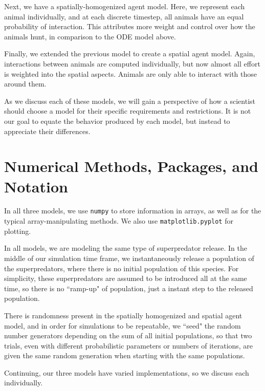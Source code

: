 \documentclass[journal]{IEEEtran}
\begin{document}
Next, we have a spatially-homogenized agent model. Here, we represent each animal individually, and at each discrete timestep, all animals have an equal probability of interaction. This attributes more weight and control over how the animals hunt, in comparison to the ODE model above.\par
Finally, we extended the previous model to create a spatial agent model. Again, interactions between animals are computed individually, but now almost all effort is weighted into the spatial aspects. Animals are only able to interact with those around them.\par
As we discuss each of these models, we will gain a perspective of how a scientist should choose a model for their specific requirements and restrictions. It is not our goal to equate the behavior produced by each model, but instead to appreciate their differences.

\section{Numerical Methods, Packages, and Notation}
In all three models, we use \verb|numpy| to store information in arrays, as well as for the typical array-manipulating methods. We also use \verb|matplotlib.pyplot| for plotting.\par
In all models, we are modeling the same type of superpredator release. In the middle of our simulation time frame, we instantaneously release a population of the superpredators, where there is no initial population of this species. For simplicity, these superpredators are assumed to be introduced all at the same time, so there is no ``ramp-up" of population, just a instant step to the released population.\par
There is randomness present in the spatially homogenized and spatial agent model, and in order for simulations to be repeatable, we ``seed" the random number generators depending on the sum of all initial populations, so that two trials, even with different probabilistic parameters or numbers of iterations, are given the same random generation when starting with the same populations.\par
Continuing, our three models have varied implementations, so we discuss each individually.
\end{document}
